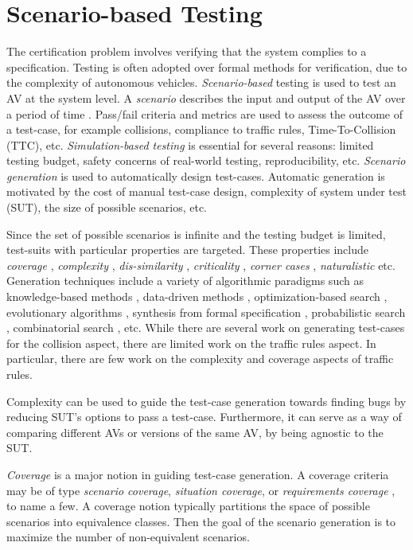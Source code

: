 \section{Scenario-based Testing}

The certification problem involves verifying that the system complies to a specification.
%
Testing is often adopted over formal methods for verification, due to the complexity of autonomous vehicles.
%
\emph{Scenario-based} testing \cite{Riedmaier.2020} is used to test an AV at the system level.
%
A \emph{scenario} describes the input and output of the AV over a period of time \cite{Ulbrich.2015}.
%
Pass/fail criteria and metrics are used to assess the outcome of a test-case, for example collisions,  compliance to traffic rules, Time-To-Collision (TTC), etc.
%
\emph{Simulation-based testing} \cite{Abdessalem.2018:feature,Abdessalem.2018:vision,Abeysirigoonawardena.2019,Abdessalem.2016,Ding.2020,Gambi.2019,Norden.2019} is essential for several reasons: limited testing budget, safety concerns of real-world testing, reproducibility, etc.
%
\emph{Scenario generation} is used to automatically design test-cases.
%
Automatic generation is motivated by the cost of manual test-case design, complexity of system under test (SUT), the size of possible scenarios, etc.


Since the set of possible scenarios is infinite and the testing budget is limited, test-suits with particular properties are targeted.
%
These properties include \emph{coverage} \cite{Sheikhi.2022}, \emph{complexity} \cite{Gao.2019,Xia.2017,Xia.2018,Wang.2018},
 \emph{dis-similarity} \cite{Harder.2021}, \emph{criticality} \cite{Klischat.2019,Zhong.2021}, \emph{corner cases} \cite{OKelly.2018}, \emph{naturalistic} \cite{Akagi.2019}
 etc.
%
Generation techniques include a variety of algorithmic paradigms such as  knowledge-based methods \cite{Li.2020}, data-driven methods \cite{OKelly.2018}, optimization-based search \cite{Klischat.2020,Feng_Methodology.2020,Feng_CaseStudies.2020}, evolutionary algorithms \cite{Klischat.2019,Calo.2020,Zhong.2021,Sheikhi.2022}, synthesis from formal specification \cite{Klischat.2020,Tuncali.2019}, probabilistic search \cite{Fremont_testing.2020,Tuncali.2016}, combinatorial search \cite{Tuncali.2019,Gao.2019,Xia.2018}, etc.
%
While there are several work on generating test-cases for the collision aspect, there are limited work on the traffic rules aspect.
%
In particular, there are few work on the complexity and coverage aspects of traffic rules.


Complexity can be used to guide the test-case generation towards finding bugs by reducing SUT's options to pass a test-case.
%
Furthermore, it can serve as a way of comparing different AVs or versions of the same AV, by being agnostic to the SUT.


\emph{Coverage} \cite{Tahir.2020,Tahir.2022,Xia.2018,Hawkins.2019,Majzik.2019,Tang.2021} is a major notion in guiding test-case generation.
%
A coverage criteria may be of type \emph{scenario coverage}, \emph{situation coverage}, or \emph{requirements coverage} \cite{Tahir.2020}, to name a few.
%
A coverage notion typically partitions the space of possible scenarios into equivalence classes.
%
Then the goal of the scenario generation is to maximize the number of non-equivalent scenarios.
